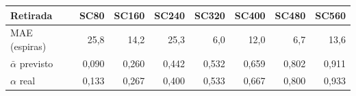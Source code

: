 \begin{tabular}{lrrrrrrr}
\toprule
Retirada & SC80 & SC160 & SC240 & SC320 & SC400 & SC480 & SC560 \\
\midrule
MAE (espiras) & 25,8 & 14,2 & 25,3 & 6,0 & 12,0 & 6,7 & 13,6 \\
$\bar{\alpha}$ previsto & 0,090 & 0,260 & 0,442 & 0,532 & 0,659 & 0,802 & 0,911 \\
$\alpha$ real & 0,133 & 0,267 & 0,400 & 0,533 & 0,667 & 0,800 & 0,933 \\
\bottomrule
\end{tabular}
